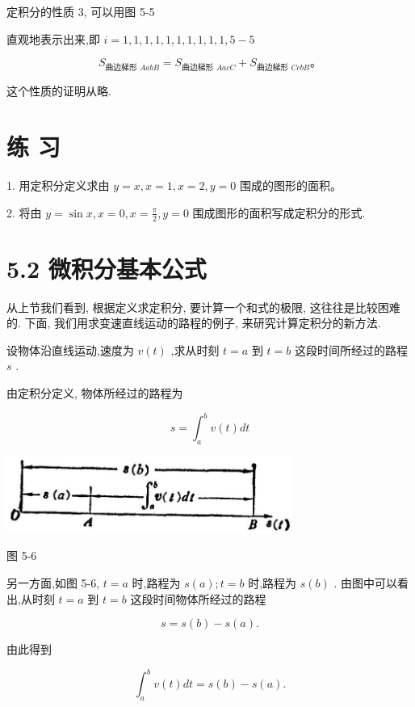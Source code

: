\documentclass[10pt]{article}
\begin{document}
定积分的性质 3, 可以用图 5-5

直观地表示出来,即 \(i = 1,1,1,1,1,1,1,1,1,1,5 - 5\)

\[
{S}_{\text{曲边梯形 }{AabB}} = {S}_{\text{曲边梯形 }{AacC}} + {S}_{\text{曲边梯形 }{CcbB}}\text{。}
\]

这个性质的证明从略.

\section*{练 习}

1. 用定积分定义求由 \(y = x,x = 1,x = 2,y = 0\) 围成的图形的面积。

2. 将由 \(y = \sin x,x = 0,x = \frac{\pi }{2},y = 0\) 围成图形的面积写成定积分的形式.

\section*{5.2 微积分基本公式}

从上节我们看到, 根据定义求定积分, 要计算一个和式的极限, 这往往是比较困难的. 下面, 我们用求变速直线运动的路程的例子, 来研究计算定积分的新方法.

设物体沿直线运动,速度为 \(v\left( t\right)\) ,求从时刻 \(t = a\) 到 \(t = b\) 这段时间所经过的路程 \(s\) .

由定积分定义, 物体所经过的路程为

\[
s = {\int }_{a}^{b}v\left( t\right) {dt}
\]

\begin{center}
\includegraphics[max width=0.7\textwidth]{images/01912c18-5c3f-733d-b775-749ba9897a9d_225_134815.jpg}
\end{center}

图 5-6

另一方面,如图 5-6, \(t = a\) 时,路程为 \(s\left( a\right) ;t = b\) 时,路程为 \(s\left( b\right)\) . 由图中可以看出,从时刻 \(t = a\) 到 \(t = b\) 这段时间物体所经过的路程

\[
s = s\left( b\right) - s\left( a\right) .
\]

由此得到

\[
{\int }_{a}^{b}v\left( t\right) {dt} = s\left( b\right) - s\left( a\right) .
\]
\end{document}
